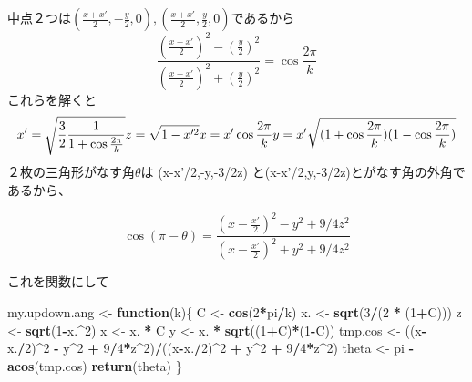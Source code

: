\documentclass[]{article}
\newenvironment{Shaded}{\begin{snugshade}}{\end{snugshade}}
\newcommand{\KeywordTok}[1]{\textcolor[rgb]{0.13,0.29,0.53}{\textbf{#1}}}
\newcommand{\DecValTok}[1]{\textcolor[rgb]{0.00,0.00,0.81}{#1}}
\newcommand{\StringTok}[1]{\textcolor[rgb]{0.31,0.60,0.02}{#1}}
\newcommand{\ControlFlowTok}[1]{\textcolor[rgb]{0.13,0.29,0.53}{\textbf{#1}}}
\newcommand{\OperatorTok}[1]{\textcolor[rgb]{0.81,0.36,0.00}{\textbf{#1}}}
\newcommand{\NormalTok}[1]{#1}
\begin{document}
中点２つは\((\frac{x+x'}{2},-\frac{y}{2},0),(\frac{x+x'}{2},\frac{y}{2},0)\)であるから
\[
\frac{(\frac{x+x'}{2})^2 - (\frac{y}{2})^2}{(\frac{x+x'}{2})^2 + (\frac{y}{2})^2} = \cos{\frac{2\pi}{k}}
\] これらを解くと \[
x' = \sqrt{\frac{3}{2}\frac{1}{1+\cos{\frac{2\pi}{k}}}}\\
z = \sqrt{1-x'^2}\\
x = x' \cos{\frac{2\pi}{k}}\\
y = x' \sqrt{(1+\cos{\frac{2\pi}{k}})(1-\cos{\frac{2\pi}{k}})}
\] ２枚の三角形がなす角\(\theta\)は (x-x'/2,-y,-3/2z)
と(x-x'/2,y,-3/2z)とがなす角の外角であるから、

\[
\cos{(\pi-\theta)} = \frac{(x-\frac{x'}{2})^2-y^2+9/4z^2}{(x-\frac{x'}{2})^2+y^2+9/4z^2}
\]

これを関数にして

\begin{Shaded}
\begin{Highlighting}[]
\NormalTok{my.updown.ang <-}\StringTok{ }\ControlFlowTok{function}\NormalTok{(k)\{}
\NormalTok{  C <-}\StringTok{ }\KeywordTok{cos}\NormalTok{(}\DecValTok{2}\OperatorTok{*}\NormalTok{pi}\OperatorTok{/}\NormalTok{k)}
\NormalTok{  x. <-}\StringTok{ }\KeywordTok{sqrt}\NormalTok{(}\DecValTok{3}\OperatorTok{/}\NormalTok{(}\DecValTok{2} \OperatorTok{*}\StringTok{ }\NormalTok{(}\DecValTok{1}\OperatorTok{+}\NormalTok{C)))}
\NormalTok{  z <-}\StringTok{ }\KeywordTok{sqrt}\NormalTok{(}\DecValTok{1}\OperatorTok{-}\NormalTok{x.}\OperatorTok{^}\DecValTok{2}\NormalTok{)}
\NormalTok{  x <-}\StringTok{ }\NormalTok{x. }\OperatorTok{*}\StringTok{ }\NormalTok{C}
\NormalTok{  y <-}\StringTok{ }\NormalTok{x. }\OperatorTok{*}\StringTok{ }\KeywordTok{sqrt}\NormalTok{((}\DecValTok{1}\OperatorTok{+}\NormalTok{C)}\OperatorTok{*}\NormalTok{(}\DecValTok{1}\OperatorTok{-}\NormalTok{C))}
\NormalTok{  tmp.cos <-}\StringTok{ }\NormalTok{((x}\OperatorTok{-}\NormalTok{x.}\OperatorTok{/}\DecValTok{2}\NormalTok{)}\OperatorTok{^}\DecValTok{2} \OperatorTok{-}\StringTok{ }\NormalTok{y}\OperatorTok{^}\DecValTok{2} \OperatorTok{+}\StringTok{ }\DecValTok{9}\OperatorTok{/}\DecValTok{4}\OperatorTok{*}\NormalTok{z}\OperatorTok{^}\DecValTok{2}\NormalTok{)}\OperatorTok{/}\NormalTok{((x}\OperatorTok{-}\NormalTok{x.}\OperatorTok{/}\DecValTok{2}\NormalTok{)}\OperatorTok{^}\DecValTok{2} \OperatorTok{+}\StringTok{ }\NormalTok{y}\OperatorTok{^}\DecValTok{2} \OperatorTok{+}\StringTok{ }\DecValTok{9}\OperatorTok{/}\DecValTok{4}\OperatorTok{*}\NormalTok{z}\OperatorTok{^}\DecValTok{2}\NormalTok{)}
\NormalTok{  theta <-}\StringTok{ }\NormalTok{pi }\OperatorTok{-}\StringTok{ }\KeywordTok{acos}\NormalTok{(tmp.cos)}
  \KeywordTok{return}\NormalTok{(theta) }
\NormalTok{\}}
\end{Highlighting}
\end{Shaded}
\end{document}
